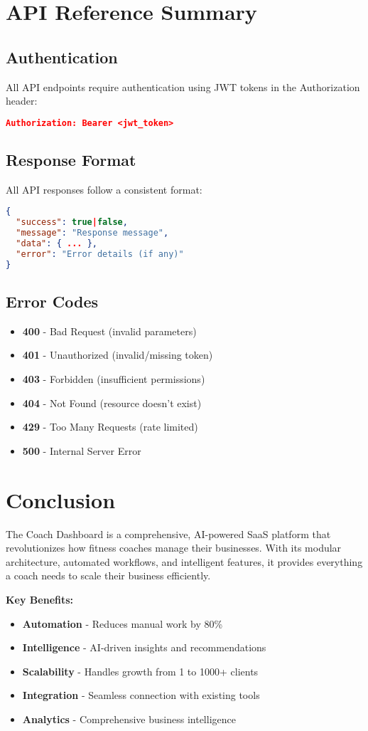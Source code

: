 \documentclass[12pt,a4paper]{article}
\newcommand{\samplecode}[1]{\begin{lstlisting}[language=JSON]#1\end{lstlisting}}
\begin{document}
\section{API Reference Summary}

\subsection{Authentication}
All API endpoints require authentication using JWT tokens in the Authorization header:
\samplecode{
Authorization: Bearer <jwt_token>
}

\subsection{Response Format}
All API responses follow a consistent format:
\samplecode{
{
  "success": true|false,
  "message": "Response message",
  "data": { ... },
  "error": "Error details (if any)"
}
}

\subsection{Error Codes}
\begin{itemize}
    \item \textbf{400} - Bad Request (invalid parameters)
    \item \textbf{401} - Unauthorized (invalid/missing token)
    \item \textbf{403} - Forbidden (insufficient permissions)
    \item \textbf{404} - Not Found (resource doesn't exist)
    \item \textbf{429} - Too Many Requests (rate limited)
    \item \textbf{500} - Internal Server Error
\end{itemize}

\section{Conclusion}

The Coach Dashboard is a comprehensive, AI-powered SaaS platform that revolutionizes how fitness coaches manage their businesses. With its modular architecture, automated workflows, and intelligent features, it provides everything a coach needs to scale their business efficiently.

\textbf{Key Benefits:}
\begin{itemize}
    \item \textbf{Automation} - Reduces manual work by 80\%
    \item \textbf{Intelligence} - AI-driven insights and recommendations
    \item \textbf{Scalability} - Handles growth from 1 to 1000+ clients
    \item \textbf{Integration} - Seamless connection with existing tools
    \item \textbf{Analytics} - Comprehensive business intelligence
\end{itemize}
\end{document}
